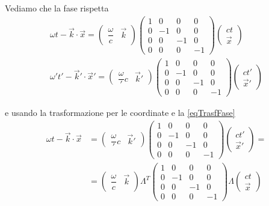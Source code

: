\documentclass[12pt,a4paper,titlepage, twoside, openright]{book}
\newenvironment{proof:}[1][\proofname]{  %
 \begin{tcolorbox}[
	breakable, 
	enhanced, 
	interior hidden, 
	frame hidden, 
	borderline west = {1pt}{0pt}{gray}, 
	top=0pt, bottom=0pt, left=0pt]
\begin{proof}[#1:]~
}
{
\end{proof}
\end{tcolorbox}
}
\numberwithin{equation}{chapter}
\begin{document}
\begin{proof:}
Vediamo che la fase rispetta
\[\begin{split}
\omega t - \vec{k}\cdot\vec{x} = \left(\begin{array}{cc} \dfrac{\omega}{c} & \vec{k} \end{array}\right) \left(\begin{array}{cccc}
1 & 0 & 0 & 0 \\
0 & -1 & 0 & 0 \\
0 & 0 & -1 & 0 \\
0 & 0 & 0 & -1
\end{array}\right) \left(\begin{array}{c}
ct \\ \vec{x}
\end{array}\right)
\\ 
\omega' t' - \vec{k}'\cdot\vec{x}' = \left(\begin{array}{cc} \dfrac{\omega}'{c} & \vec{k}' \end{array}\right) \left(\begin{array}{cccc}
1 & 0 & 0 & 0 \\
0 & -1 & 0 & 0 \\
0 & 0 & -1 & 0 \\
0 & 0 & 0 & -1
\end{array}\right)  \left(\begin{array}{c}
ct' \\ \vec{x}'
\end{array}\right)
\end{split}
\]

e usando la trasformazione per le coordinate e la \eqref{eqTrasfFase}
\begin{align*}
\omega t -\vec{k}\cdot\vec{x} &= \left(\begin{array}{cc} \dfrac{\omega}'{c} & \vec{k}' \end{array}\right) \left(\begin{array}{cccc}
1 & 0 & 0 & 0 \\
0 & -1 & 0 & 0 \\
0 & 0 & -1 & 0 \\
0 & 0 & 0 & -1
\end{array}\right) \left(\begin{array}{c}
ct' \\ \vec{x}'
\end{array}\right) = \\ &=
\left(\begin{array}{cc} \dfrac{\omega}{c} & \vec{k} \end{array}\right) \Lambda^T \left(\begin{array}{cccc}
1 & 0 & 0 & 0 \\
0 & -1 & 0 & 0 \\
0 & 0 & -1 & 0 \\
0 & 0 & 0 & -1
\end{array}\right) \Lambda \left(\begin{array}{c}
ct \\ \vec{x}
\end{array}\right)
\end{align*}


\end{proof:}
\end{document}
